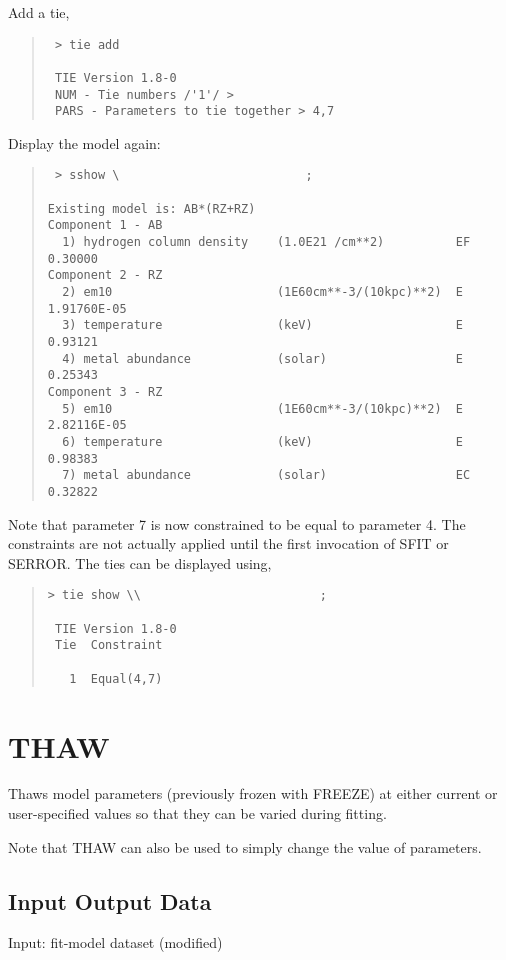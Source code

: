 \documentclass{book}
\renewcommand{\_}{{\tt\char'137}}     %
\begin{document}
Add a tie,
\begin{quote}\begin{verbatim}
 > tie add

 TIE Version 1.8-0
 NUM - Tie numbers /'1'/ >
 PARS - Parameters to tie together > 4,7
\end{verbatim}\end{quote}
Display the model again:
\begin{quote}\begin{verbatim}
 > sshow \                          ;

Existing model is: AB*(RZ+RZ)
Component 1 - AB
  1) hydrogen column density    (1.0E21 /cm**2)          EF  0.30000
Component 2 - RZ
  2) em10                       (1E60cm**-3/(10kpc)**2)  E   1.91760E-05
  3) temperature                (keV)                    E   0.93121
  4) metal abundance            (solar)                  E   0.25343
Component 3 - RZ
  5) em10                       (1E60cm**-3/(10kpc)**2)  E   2.82116E-05
  6) temperature                (keV)                    E   0.98383
  7) metal abundance            (solar)                  EC  0.32822
\end{verbatim}\end{quote}
Note that parameter 7 is now constrained to be equal to parameter 4. The
constraints are not actually applied until the first invocation of SFIT
or SERROR. The ties can be displayed using,
\begin{quote}\begin{verbatim}
> tie show \\                         ;

 TIE Version 1.8-0
 Tie  Constraint

   1  Equal(4,7)
\end{verbatim}\end{quote}
\section{THAW}
Thaws model parameters (previously frozen with FREEZE) at either
current or user-specified values so that they can be varied
during fitting.

Note that THAW can also be used to simply change the value of
parameters.

\subsection{Input Output Data}
Input: fit-model dataset (modified)
\end{document}
